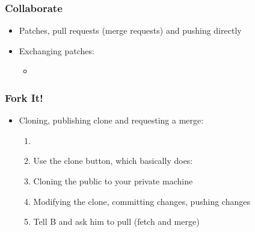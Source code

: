 \begin{slide}[fragile]
  \frametitle{Collaborate}
  \begin{itemize}
    \item Patches, pull requests (merge requests) and pushing directly
    \item Exchanging patches:
    \begin{itemize}
      \item[]
    \end{itemize}
  \end{itemize}
\end{slide}

\begin{slide}[fragile]
  \frametitle{Fork It!}
  \begin{itemize}
    \item Cloning, publishing clone and requesting a merge:
    \begin{enumerate}
      \item[]
      \item Use the clone button, which basically does:
      \item Cloning the public to your private machine
      \item Modifying the clone, committing changes, pushing changes
      \item Tell B and ask him to pull (fetch and merge)
    \end{enumerate}
  \end{itemize}
\end{slide}
